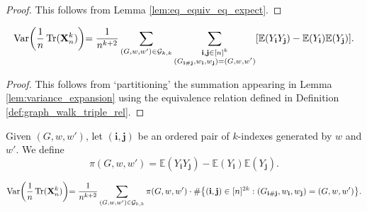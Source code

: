 \begin{proof}
This follows from Lemma \ref{lem:eq_equiv_eq_expect}.
\end{proof}
\begin{lemma}
  \notready
  \label{lem:sum_eq_sum_over_classes}
  \[
  \text{Var} \biggl(\frac{1}{n} \operatorname{Tr} (\mathbf{X}_n^k) \biggl) 
  = \frac{1}{n^{k+2}} \sum_{(G,w,w') \in \mathcal{G}_{k,k}} \sum_{\substack{\mathbf{i},\mathbf{j} \in [n]^k \\ (G_{\mathbf{i}\#\mathbf{j}},w_\mathbf{i},w_\mathbf{j}) = (G,w,w')}} [\mathbb{E}(Y_\mathbf{i} Y_\mathbf{j}) - \mathbb{E}(Y_\mathbf{i}) \mathbb{E}(Y_\mathbf{j})].
  \]
\end{lemma}
\begin{proof}
  This follows from `partitioning' the summation appearing in Lemma \ref{lem:variance_expansion} using the equivalence relation defined in Definition \ref{def:graph_walk_triple_rel}.
\end{proof}
\begin{definition}
  \notready
  \label{def:common_val_prod}
  Given $(G,w,w')$, let $(\mathbf{i},\mathbf{j})$ be an ordered pair of $k$-indexes generated by $w$ and $w'$. 
  We define
  \[
  \pi(G,w,w') = \mathbb{E}(Y_\mathbf{i} Y_\mathbf{j}) - \mathbb{E}(Y_\mathbf{i}) \mathbb{E}(Y_\mathbf{j}).
  \]
\end{definition}
\begin{lemma}
  \notready
  \label{lem:inner_sum_eq_common_val_prod_mul_card}
  \[
  \text{Var} \biggl(\frac{1}{n} \operatorname{Tr} (\mathbf{X}_n^k) \biggl) 
  = \frac{1}{n^{k+2}} \sum_{(G,w,w') \in \mathcal{G}_{k,k}} \pi(G,w,w')
\cdot \# \bigl\{ (\mathbf{i},\mathbf{j}) \in [n]^{2k} : (G_{\mathbf{i} \# \mathbf{j}},w_\mathbf{i},w_\mathbf{j}) = (G,w,w') \bigl\}.
  \]
\end{lemma}
